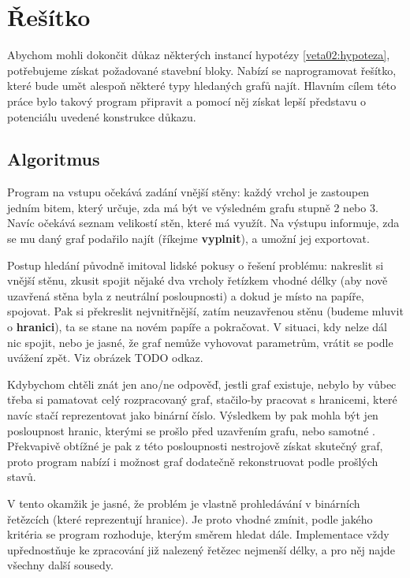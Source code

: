 
\chapter{Řešítko} \label{resitko}
Abychom mohli dokončit důkaz některých instancí hypotézy \ref{veta02:hypoteza}, potřebujeme získat požadované stavební bloky. Nabízí se naprogramovat řešítko, které bude umět alespoň některé typy hledaných grafů najít. Hlavním cílem této práce bylo takový program připravit a pomocí něj získat lepší představu o potenciálu uvedené konstrukce důkazu.

\section{Algoritmus}

Program na vstupu očekává zadání vnější stěny: každý vrchol je zastoupen jedním bitem, který určuje, zda má být ve výsledném grafu stupně 2 nebo 3. Navíc očekává seznam velikostí stěn, které má využít. Na výstupu informuje, zda se mu daný graf podařilo najít (říkejme \textbf{vyplnit}), a umožní jej exportovat.

Postup hledání původně imitoval lidské pokusy o řešení problému: nakreslit si vnější stěnu, zkusit spojit nějaké dva vrcholy řetízkem vhodné délky (aby nově uzavřená stěna byla z neutrální posloupnosti) a dokud je místo na papíře, spojovat. Pak si překreslit nejvnitřnější, zatím neuzavřenou stěnu (budeme mluvit o \textbf{hranici}), ta se stane  na novém papíře a pokračovat. V situaci, kdy nelze dál nic spojit, nebo je jasné, že graf nemůže vyhovovat parametrům, vrátit se podle uvážení zpět. Viz obrázek TODO odkaz.

Kdybychom chtěli znát jen ano/ne odpověď, jestli graf existuje, nebylo by vůbec třeba si pamatovat celý rozpracovaný graf, stačilo-by pracovat s hranicemi, které navíc stačí reprezentovat jako binární číslo. Výsledkem by pak mohla být jen posloupnost hranic, kterými se prošlo před uzavřením grafu, nebo samotné . Překvapivě obtížné je pak z této posloupnosti nestrojově získat skutečný graf, proto program nabízí i možnost graf dodatečně rekonstruovat podle prošlých stavů.

V tento okamžik je jasné, že problém je vlastně prohledávání v binárních řetězcích (které reprezentují hranice). Je proto vhodné zmínit, podle jakého kritéria se program rozhoduje, kterým směrem hledat dále. Implementace vždy upřednostňuje ke zpracování již nalezený řetězec nejmenší délky, a pro něj najde všechny další sousedy.

